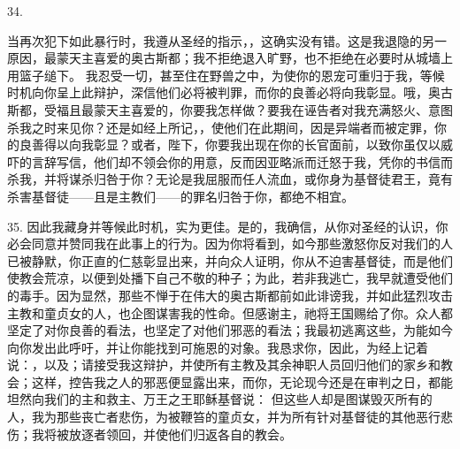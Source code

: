 34. \par

当再次犯下如此暴行时，我遵从圣经的指示，，这确实没有错。这是我退隐的另一原因，最蒙天主喜爱的奥古斯都；我不拒绝退入旷野，也不拒绝在必要时从城墙上用篮子缒下。 我忍受一切，甚至住在野兽之中，为使你的恩宠可重归于我，等候时机向你呈上此辩护，深信他们必将被判罪，而你的良善必将向我彰显。哦，奥古斯都，受福且最蒙天主喜爱的，你要我怎样做？要我在诬告者对我充满怒火、意图杀我之时来见你？还是如经上所记，，使他们在此期间，因是异端者而被定罪，你的良善得以向我彰显？或者，陛下，你要我出现在你的长官面前，以致你虽仅以威吓的言辞写信，他们却不领会你的用意，反而因亚略派而迁怒于我，凭你的书信而杀我，并将谋杀归咎于你？无论是我屈服而任人流血，或你身为基督徒君王，竟有杀害基督徒——且是主教们——的罪名归咎于你，都绝不相宜。\par

35. 因此我藏身并等候此时机，实为更佳。是的，我确信，从你对圣经的认识，你必会同意并赞同我在此事上的行为。因为你将看到，如今那些激怒你反对我们的人已被静默，你正直的仁慈彰显出来，并向众人证明，你从不迫害基督徒，而是他们使教会荒凉，以便到处播下自己不敬的种子；为此，若非我逃亡，我早就遭受他们的毒手。因为显然，那些不惮于在伟大的奥古斯都前如此诽谤我，并如此猛烈攻击主教和童贞女的人，也企图谋害我的性命。但感谢主，祂将王国赐给了你。众人都坚定了对你良善的看法，也坚定了对他们邪恶的看法；我最初逃离这些，为能如今向你发出此呼吁，并让你能找到可施恩的对象。我恳求你，因此，为经上记着说：，以及；请接受我这辩护，并使所有主教及其余神职人员回归他们的家乡和教会；这样，控告我之人的邪恶便显露出来，而你，无论现今还是在审判之日，都能坦然向我们的主和救主、万王之王耶稣基督说： 但这些人却是图谋毁灭所有的人，我为那些丧亡者悲伤，为被鞭笞的童贞女，并为所有针对基督徒的其他恶行悲伤；我将被放逐者领回，并使他们归返各自的教会。\par

